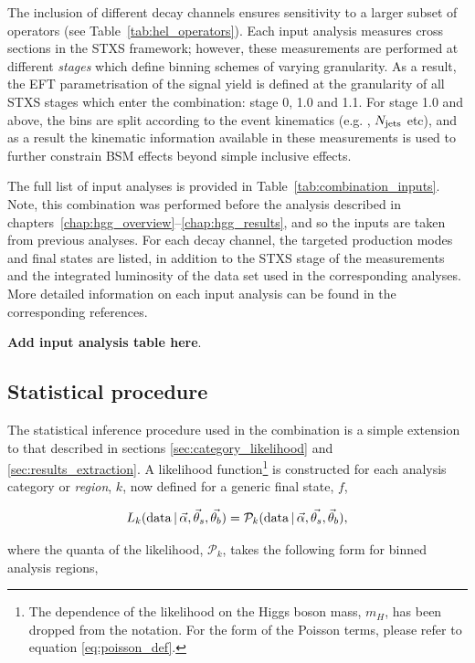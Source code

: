 The inclusion of different decay channels ensures sensitivity to a larger subset of operators (see Table~\ref{tab:hel_operators}). Each input analysis measures cross sections in the STXS framework; however, these measurements are performed at different \textit{stages} which define binning schemes of varying granularity.
As a result, the EFT parametrisation of the signal yield is defined at the granularity of all STXS stages which enter the combination: stage 0, 1.0 and 1.1. For stage 1.0 and above, the bins are split according to the event kinematics (e.g. \ptH, $N_{\rm{jets}}$ etc), and as a result the kinematic information available in these measurements is used to further constrain BSM effects beyond simple inclusive effects.

The full list of input analyses is provided in Table~\ref{tab:combination_inputs}. Note, this combination was performed before the \Hgg analysis described in chapters~\ref{chap:hgg_overview}--\ref{chap:hgg_results}, and so the \Hgg inputs are taken from previous analyses. For each decay channel, the targeted production modes and final states are listed, in addition to the STXS stage of the measurements and the integrated luminosity of the data set used in the corresponding analyses. More detailed information on each input analysis can be found in the corresponding references.

\textbf{Add input analysis table here}.

\subsection{Statistical procedure}
The statistical inference procedure used in the combination is a simple extension to that described in sections \ref{sec:category_likelihood} and \ref{sec:results_extraction}. A likelihood function\footnote{The dependence of the likelihood on the Higgs boson mass, $m_H$, has been dropped from the notation. For the form of the Poisson terms, please refer to equation \ref{eq:poisson_def}.} is constructed for each analysis category or \textit{region}, $k$, now defined for a generic final state, $f$,

\begin{equation}
    L_k({\rm{data}}\,|\,\vec{\alpha},\vec{\theta}_s,\vec{\theta_b}) = \mathcal{P}_k( {\rm{data}}\,|\,\vec{\alpha},\vec{\theta_s},\vec{\theta}_b),
\end{equation}

\noindent
where the quanta of the likelihood, $\mathcal{P}_k$, takes the following form for binned analysis regions,

